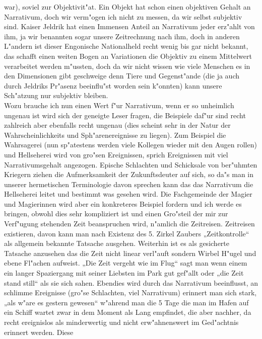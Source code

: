 \documentclass[a5paper,8pt]{book}
\begin{document}
war), soviel zur Objektivit"at.
Ein Objekt hat schon einen objektiven Gehalt an Narrativum, doch wir verm"ogen ich nicht zu messen, da wir selbst subjektiv sind. 
Kaiser Jeldrik hat einen Immensen Anteil an Narrativum jeder erz"ahlt von ihm, ja wir benannten sogar unsere Zeitrechnung nach ihm, 
doch in anderen L"andern ist dieser Engonische Nationalheld recht wenig bis gar nicht bekannt, das schafft einen weiten Bogen an 
Variationen die Objektiv zu einem Mittelwert verarbeitet werden m"ussten, doch da wir nicht wissen wie viele Menschen es in den 
Dimensionen gibt geschweige denn Tiere und Gegenst"ande (die ja auch durch Jeldriks Pr"asenz beeinflu"st worden sein k"onnten) kann 
unsere Sch"atzung nur subjektiv bleiben.\\

Wozu brauche ich nun einen Wert f"ur Narrativum, wenn er so unheimlich ungenau ist wird sich der geneigte Leser fragen, die Beispiele 
daf"ur sind recht zahlreich aber ebenfalls recht ungenau (dies scheint sehr in der Natur der Wahrscheinlichkeits und Sph"arenereignisse 
zu liegen). Zum Beispiel die Wahrsagerei (nun sp"atestens werden viele Kollegen wieder mit den Augen rollen) und Hellseherei wird von 
gro"sen Ereignissen, sprich Ereignissen mit viel Narrativumsgehalt angezogen. Epische Schlachten und Schicksale von ber"uhmten Kriegern 
ziehen die Aufmerksamkeit der Zukunftsdeuter auf sich, so da"s man in unserer hermetischen Terminologie davon sprechen kann das das 
Narrativum die Hellseherei leitet und bestimmt was gesehen wird.
Die Fachgemeinde der Magier und Magierinnen wird aber ein konkreteres Beispiel fordern und ich werde es bringen, obwohl dies sehr kompliziert 
ist und einen Gro"steil der mir zur Verf"ugung stehenden Zeit beanspruchen wird, n"amlich die Zeitreisen.
Zeitreisen existieren, davon kann man nach Existenz des 5. Zirkel Zaubers „Zeitkontrolle“ als allgemein bekannte Tatsache ausgehen. 
Weiterhin ist es als gesicherte Tatsache anzusehen das die Zeit nicht linear verl"auft sondern Wirbel H"ugel und ebene Fl"achen aufweist.
„Die Zeit vergeht wie im Flug“ sagt man wenn einem ein langer Spaziergang mit seiner Liebsten im Park gut gef"allt oder „die Zeit stand 
still“ als sie sich sahen. Ebendies wird durch das Narrativum beeinflusst, an schlimme Ereignisse (gro"se Schlachten, viel Narrativum) 
erinnert man sich stark, „als w"are es gestern gewesen“ w"ahrend man die 5 Tage die man im Hafen auf ein Schiff wartet zwar in dem Moment 
als Lang empfindet, die aber nachher, da recht ereignislos als minderwertig und nicht erw"ahnenswert im Ged"achtnis erinnert werden. Diese 
\end{document}
